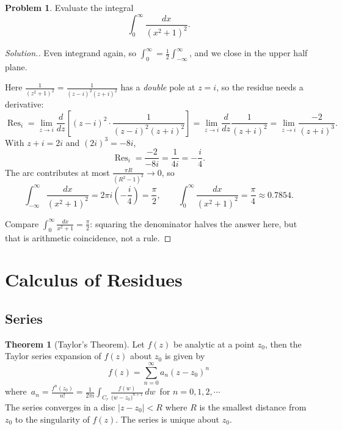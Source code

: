 \documentclass[11pt,a4paper]{article}
\theoremstyle{definition}
\newtheorem{thm}{Theorem}[section]
\newtheorem{problemx}{Problem}[section]
\newenvironment{problem}{\begin{problemx}}{\end{problemx}}
\newenvironment{solution}
  {\renewcommand{\qedsymbol}{}\begin{proof}[\textit{Solution}.]}
  {\end{proof}}
\begin{document}
\begin{problem}
Evaluate the integral
$$\int^{\infty}_{0}\frac{dx}{(x^{2} + 1)^{2}} .$$
\end{problem}

\begin{solution}
Even integrand again, so $\int^{\infty}_{0} = \tfrac12\int^{\infty}_{-\infty}$,
and we close in the upper half plane.

Here $\frac{1}{(z^2+1)^2} = \frac{1}{(z-i)^2(z+i)^2}$ has a \emph{double} pole
at $z = i$, so the residue needs a derivative:
$$\operatorname{Res}_{i} = \lim_{z \rightarrow i}\frac{d}{dz}
\left[(z-i)^2 \cdot \frac{1}{(z-i)^2(z+i)^2}\right]
= \lim_{z \rightarrow i}\frac{d}{dz}\frac{1}{(z+i)^2}
= \lim_{z \rightarrow i}\frac{-2}{(z+i)^3}.$$
With $z + i = 2i$ and $(2i)^3 = -8i$,
$$\operatorname{Res}_{i} = \frac{-2}{-8i} = \frac{1}{4i} = -\frac{i}{4}.$$
The arc contributes at most $\frac{\pi R}{(R^2-1)^2} \rightarrow 0$, so
$$\int^{\infty}_{-\infty}\frac{dx}{(x^2+1)^2}
= 2\pi i\left(-\frac{i}{4}\right) = \frac{\pi}{2},
\qquad
\boxed{\int^{\infty}_{0}\frac{dx}{(x^2+1)^2} = \frac{\pi}{4} \approx 0.7854 .}$$

Compare $\int^{\infty}_{0}\frac{dx}{x^2+1} = \frac{\pi}{2}$: squaring the
denominator halves the answer here, but that is arithmetic coincidence, not a
rule.
\end{solution}

\pagebreak
{\color[wave]{485}\section{Calculus of Residues}}

{\color[wave]{485}\subsection{Series}}

\begin{thm}[Taylor's Theorem]
Let $f(z)$ be analytic at a point $z_0$, then the Taylor series expansion of $f(z)$ about $z_0$ is given by $$f(z) = \sum^{\infty}_{n = 0} a_n (z - z_0)^n$$ where $\,\displaystyle{a_n = \frac{f^n(z_0)}{n!} = \frac{1}{2\pi i}\int_{C_r}\frac{f(w)}{\big(w - z_0\big)^{n+1}}\,dw\,}$ for $n= 0, 1 , 2,\cdots$\\

The series converges in a disc $\left|z - z_0\right| < R$ where $R$ is the smallest distance from $z_0$ to the singularity of $f(z)$. The series is unique about $z_0$.
\end{thm}
\end{document}
